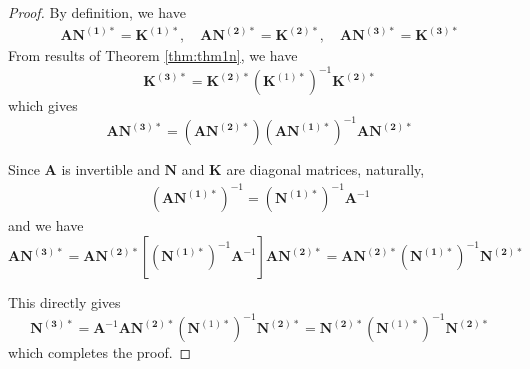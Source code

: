 \documentclass{article} %
\begin{document}
\begin{appendices}{}
\begin{proof}
By definition, we have
    \begin{equation*}
\begin{aligned}
\mathbf{A}\mathbf{N^{(1)*}} = \mathbf{K^{(1)*}},\quad
\mathbf{A}\mathbf{N^{(2)*}} = \mathbf{K^{(2)*}},\quad
\mathbf{A}\mathbf{N^{(3)*}} = \mathbf{K^{(3)*}}
\end{aligned}
\end{equation*}
From results of Theorem \ref{thm:thm1n}, we have
\begin{equation*}
    \mathbf{K^{(3)*}}=\mathbf{K^{(2)*}}(\mathbf{K}^{(1)*})^{-1}\mathbf{K^{(2)*}}
\end{equation*}
which gives
\begin{equation*}
    \mathbf{A}\mathbf{N^{(3)*}}=(\mathbf{A}\mathbf{N^{(2)*}})(\mathbf{A}\mathbf{N^{(1)*}})^{-1}\mathbf{A}\mathbf{N^{(2)*}}
\end{equation*}

Since $\mathbf{A}$ is invertible and $\mathbf{N}$ and $\mathbf{K}$ are diagonal matrices, naturally, 
\begin{equation*}
\begin{aligned}
(\mathbf{A}\mathbf{N^{(1)*}})^{-1} = (\mathbf{N^{(1)*}})^{-1}\mathbf{A}^{-1}
\end{aligned}
\end{equation*}
and we have
\begin{equation*}
    \mathbf{A}\mathbf{N^{(3)*}}=\mathbf{A}\mathbf{N^{(2)*}}[(\mathbf{N^{(1)*}})^{-1}\mathbf{A}^{-1}]\mathbf{A}\mathbf{N^{(2)*}}=\mathbf{A}\mathbf{N^{(2)*}}(\mathbf{N^{(1)*}})^{-1}\mathbf{N^{(2)*}}
\end{equation*}

This directly gives
\begin{equation*}
    \mathbf{N^{(3)*}}=\mathbf{A}^{-1}\mathbf{A}\mathbf{N^{(2)*}}(\mathbf{N}^{(1)*})^{-1}\mathbf{N^{(2)*}}=\mathbf{N^{(2)*}}(\mathbf{N}^{(1)*})^{-1}\mathbf{N^{(2)*}}
\end{equation*}
which completes the proof.




\end{proof}
\end{appendices}
\end{document}
